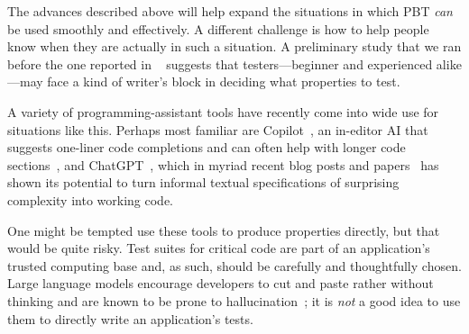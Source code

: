 
%
The advances described above will help expand the situations in which
PBT {\em can} be used smoothly and effectively.  A different challenge is
how to help people know when they are actually in such a situation.
A preliminary study that we ran before the one reported in ~\cite{goldstein_problems_2022} suggests that testers---beginner and experienced alike---may face a kind of writer's block
in deciding what properties to test.

A variety of
programming-assistant tools have recently come into wide use for situations
like this. Perhaps most familiar are
Copilot~\cite{tool:copilot}, an in-editor AI that suggests one-liner code
completions and can often help with longer code
sections~\cite{ref:dohmke2022github}, and ChatGPT~\cite{tool:chatgpt}, which in
myriad recent blog posts and papers~\cite{ref:bubeck2023sparks,ref:savelka2023thrilled} has shown its potential to turn
informal textual specifications of surprising complexity into working code.

One might be tempted use these tools to produce properties directly,
but that would be quite risky. Test suites for critical code are part
of an application's {trusted computing base} and, as such, should
be carefully and thoughtfully chosen. Large language models encourage developers to cut and
paste rather without thinking and are known to be prone
to hallucination~\cite{ji2023survey}; it is {\em not} a good idea
to use them to directly write an application's tests.


